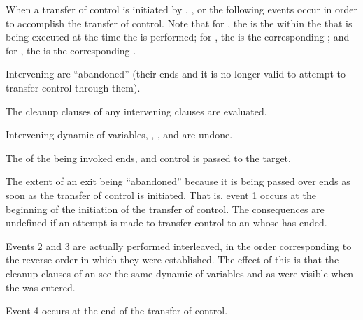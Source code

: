 


When a transfer of control is initiated by , 
, or 
the following events occur in order to accomplish the transfer of control.
Note that for , 
the  is the  within the 
that is being executed at the time the  is performed;
for ,
the  is the corresponding 
 ;
and for ,
the  is the corresponding 
 . 

\beginlist
{} 
 Intervening  are ``abandoned''
 (\ie their  ends 
      and it is no longer valid to attempt to transfer control through them).

 The cleanup clauses of any intervening  clauses
 are evaluated.
 
 Intervening dynamic  of  variables,
 , , and 
 are undone.
 
 The  of the  being invoked ends,
 and control is passed to the target.
\endlist 
 
The extent of an exit being ``abandoned'' because it is being passed over
ends as soon as the transfer of control is initiated. That is,
event 1 occurs at the beginning of the initiation of the transfer of
control. 
The consequences are undefined if an attempt is made to transfer control 
to an  whose  has ended.
 
Events 2 and 3 are actually performed interleaved, in the order
corresponding to the reverse order in which they were established.
The effect of this is that the cleanup clauses of an 
see the same dynamic  
of variables and  as were
visible when the  was entered.
 
Event 4 occurs at the end of the transfer of control.
 
